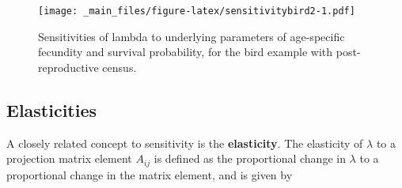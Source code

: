 \documentclass[
]{book}
\newenvironment{Shaded}{\begin{snugshade}}{\end{snugshade}}
\newcommand{\AttributeTok}[1]{\textcolor[rgb]{0.77,0.63,0.00}{#1}}
\newcommand{\CommentTok}[1]{\textcolor[rgb]{0.56,0.35,0.01}{\textit{#1}}}
\newcommand{\DecValTok}[1]{\textcolor[rgb]{0.00,0.00,0.81}{#1}}
\newcommand{\FloatTok}[1]{\textcolor[rgb]{0.00,0.00,0.81}{#1}}
\newcommand{\FunctionTok}[1]{\textcolor[rgb]{0.00,0.00,0.00}{#1}}
\newcommand{\NormalTok}[1]{#1}
\newcommand{\OtherTok}[1]{\textcolor[rgb]{0.56,0.35,0.01}{#1}}
\newcommand{\SpecialCharTok}[1]{\textcolor[rgb]{0.00,0.00,0.00}{#1}}
\newcommand{\StringTok}[1]{\textcolor[rgb]{0.31,0.60,0.02}{#1}}
\begin{document}
\begin{Shaded}
\end{Shaded}

\begin{figure}
\centering
\texttt{[image: \_main\_files/figure-latex/sensitivitybird2-1.pdf]}
\caption{\label{fig:sensitivitybird2}Sensitivities of lambda to underlying parameters of age-specific fecundity and survival probability, for the bird example with post-reproductive census.}
\end{figure}

\hypertarget{elasticities}{%
\subsection{Elasticities}\label{elasticities}}

A closely related concept to sensitivity is the \textbf{elasticity}. The elasticity of \(\lambda\) to a projection matrix element \(A_{ij}\) is defined as the proportional change in \(\lambda\) to a proportional change in the matrix element, and is given by
\end{document}
